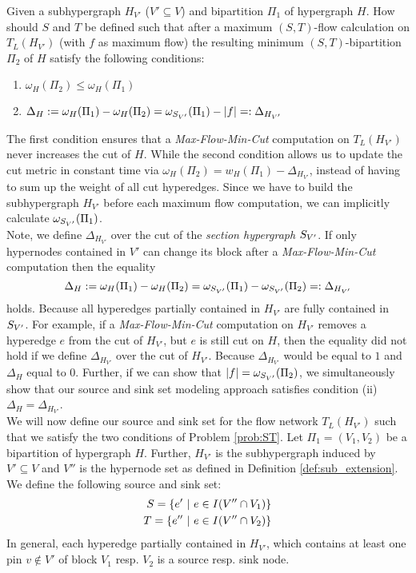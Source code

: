 \begin{problem}
\label{prob:ST} 
Given a subhypergraph $H_{V'}$ ($V' \subseteq V$) and bipartition $\Pi_1$ of hypergraph $H$.
How should $S$ and $T$ be defined such that after a maximum $(S,T)$-flow calculation on $T_L(H_{V'})$ (with 
$f$ as maximum flow) the resulting minimum $(S,T)$-bipartition $\Pi_2$ of $H$ satisfy
the following conditions:
\begin{enumerate}
\item $\omega_H(\Pi_2) \le \omega_H(\Pi_1)$
\item $\Delta_{H} := \omega_H(\Pi_1) - \omega_H(\Pi_2) = \omega_{S_{V'}}(\Pi_1) - |f| =: \Delta_{H_{V'}}$
\end{enumerate}
\end{problem}

The first condition ensures that a \emph{Max-Flow-Min-Cut} computation on $T_L(H_{V'})$ never 
increases the cut of $H$. While the second condition allows us to update the cut metric in
constant time via $\omega_H(\Pi_2) = w_H(\Pi_1) - \Delta_{H_{V'}}$, instead of having 
to sum up the weight of all cut hyperedges. Since we have to build the subhypergraph
$H_{V'}$ before each maximum flow computation, we can implicitly calculate $\omega_{S_{V'}}(\Pi_1)$.\\
Note, we define $\Delta_{H_{V'}}$ over the cut of the \emph{section hypergraph} $S_{V'}$.
If only hypernodes contained in $V'$ can change its block after a \emph{Max-Flow-Min-Cut} computation
then the equality
\[\Delta_{H} := \omega_H(\Pi_1) - \omega_H(\Pi_2) = \omega_{S_{V'}}(\Pi_1) - \omega_{S_{V'}}(\Pi_2) =: \Delta_{H_{V'}}\]
holds. Because all hyperedges partially contained in $H_{V'}$ are fully contained in $S_{V'}$.
For example, if a \emph{Max-Flow-Min-Cut} computation
on $H_{V'}$ removes a hyperedge $e$ from the cut of $H_{V'}$, but $e$ is still cut on
$H$, then the equality did not hold if we define $\Delta_{H_{V'}}$ over the cut
of $H_{V'}$. Because $\Delta_{H_{V'}}$ would be equal to $1$ and $\Delta_{H}$
equal to $0$. Further, if we can show that $|f| = \omega_{S_{V'}}(\Pi_2)$, 
we simultaneously show that our source and sink set modeling approach satisfies condition (ii) 
$\Delta_H = \Delta_{H_{V'}}$. \\
We will now define our source and sink set for the flow network $T_L(H_{V'})$ such that
we satisfy the two conditions of Problem \ref{prob:ST}. Let $\Pi_1 = (V_1,V_2)$ be
a bipartition of hypergraph $H$. Further, $H_{V'}$ is the subhypergraph induced by
$V' \subseteq V$ and $V''$ is the hypernode set as defined in Definition \ref{def:sub_extension}.
We define the following source and sink set:
\begin{align}
S = \{e'\ |\ e \in I(V'' \cap V_1)\} \label{eq:S}\\
T = \{e''\ |\ e \in I(V'' \cap V_2)\} \label{eq:T}
\end{align}
In general, each hyperedge partially contained in $H_{V'}$, which contains at least one pin
$v \notin V'$ of block $V_1$ resp. $V_2$ is a source resp. sink node.

